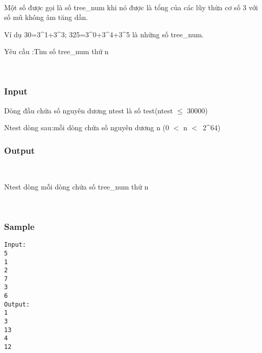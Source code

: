 

 

Một số được gọi là số tree\_num khi nó được là tổng của các lũy thừa cơ số 3 với số mũ không âm tăng dần.

Ví dụ 30=3^1+3^3; 325=3^0+3^4+3^5 là những số tree\_num.

Yêu cầu :Tìm số tree\_num thứ n

 

\subsubsection{Input}

Dòng đầu chứa số nguyên dương ntest là số test(ntest $\le$ 30000)

Ntest dòng sau:mỗi dòng chứa số nguyên dương n (0 $<$ n $<$ 2^64)

\subsubsection{Output}

 

Ntest dòng mỗi dòng chứa số tree\_num thứ n

 

\subsubsection{Sample}
\begin{verbatim}
Input:
5
1
2
7
3
6
Output:
1
3
13
4
12
\end{verbatim}
